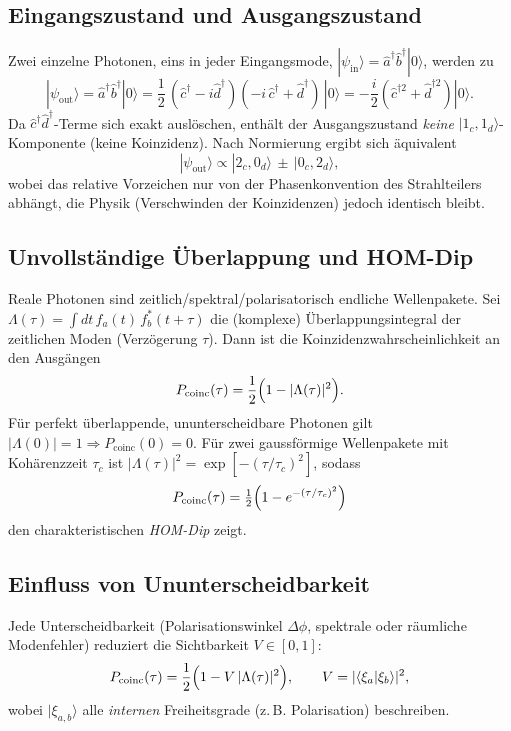 \subsection*{Eingangszustand und Ausgangszustand}
Zwei einzelne Photonen, eins in jeder Eingangs­mode,
\(|\psi_{\text{in}}\rangle=\hat a^\dagger \hat b^\dagger |0\rangle\),
werden zu
\[
|\psi_{\text{out}}\rangle
= \hat a^\dagger \hat b^\dagger |0\rangle
= \frac{1}{2}\,(\hat c^\dagger - i \hat d^\dagger)(-i\,\hat c^\dagger + \hat d^\dagger)\,|0\rangle
= -\frac{i}{2}\!\left(\hat c^{\dagger 2}+\hat d^{\dagger 2}\right)|0\rangle.
\]
Da \(\hat c^\dagger \hat d^\dagger\)-Terme sich exakt auslöschen, enthält der Ausgangszustand \emph{keine} \(|1_c,1_d\rangle\)-Komponente (keine Koinzidenz). Nach Normierung ergibt sich äquivalent
\[
|\psi_{\text{out}}\rangle
\propto |2_c,0_d\rangle \,\pm\, |0_c,2_d\rangle,
\]
wobei das relative Vorzeichen nur von der Phasenkonvention des Strahlteilers abhängt, die Physik (Verschwinden der Koinzidenzen) jedoch identisch bleibt.

\subsection*{Unvollständige Überlappung und HOM-Dip}
Reale Photonen sind zeitlich/spektral/polarisatorisch endliche Wellenpakete. Sei
\(\Lambda(\tau)=\int\!dt\, f_a(t)\,f_b^*(t+\tau)\)
die (komplexe) Überlappungsintegral der zeitlichen Moden (Verzögerung \(\tau\)).
Dann ist die Koinzidenzwahrscheinlichkeit an den Ausgängen
\[
P_{\text{coinc}}(\tau)=\frac{1}{2}\Bigl(1-|\Lambda(\tau)|^2\Bigr).
\]
Für perfekt überlappende, ununterscheidbare Photonen gilt \(|\Lambda(0)|=1\Rightarrow P_{\text{coinc}}(0)=0\).
Für zwei gaussförmige Wellenpakete mit Kohärenzzeit \(\tau_c\) ist
\(|\Lambda(\tau)|^2=\exp[-(\tau/\tau_c)^2]\),
sodass
\[
P_{\text{coinc}}(\tau)=\tfrac{1}{2}\Bigl(1-e^{-(\tau/\tau_c)^2}\Bigr)
\]
den charakteristischen \emph{HOM-Dip} zeigt.

\subsection*{Einfluss von Ununterscheidbarkeit}
Jede Unterscheidbarkeit (Polarisationswinkel \(\Delta\phi\), spektrale oder räumliche Modenfehler) reduziert die Sichtbarkeit \(V\in[0,1]\):
\[
P_{\text{coinc}}(\tau)=\frac{1}{2}\Bigl(1- V\,|\Lambda(\tau)|^2\Bigr),
\qquad
V=|\langle \xi_a|\xi_b\rangle|^2,
\]
wobei \(|\xi_{a,b}\rangle\) alle \emph{internen} Freiheitsgrade (z.\,B. Polarisation) beschreiben.

